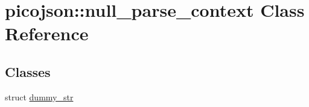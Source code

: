 \hypertarget{classpicojson_1_1null__parse__context}{\section{picojson\+:\+:null\+\_\+parse\+\_\+context Class Reference}
\label{classpicojson_1_1null__parse__context}
}
\subsection*{Classes}
\begin{DoxyCompactItemize}
\item 
struct \hyperlink{structpicojson_1_1null__parse__context_1_1dummy__str}{dummy\+\_\+str}
\end{DoxyCompactItemize}
